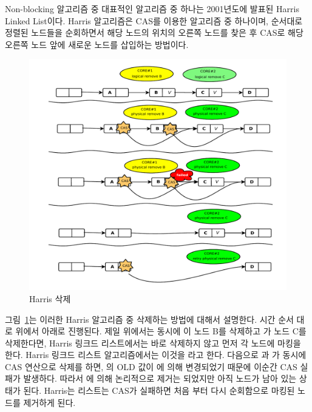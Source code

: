 Non-blocking 알고리즘 중 대표적인 알고리즘 중 하나는 2001년도에 발표된 
Harris Linked List이다. 
Harris 알고리즘은 CAS를 이용한 알고리즘 중 하나이며, 순서대로 정렬된 노드들을 
순회하면서 해당 노드의 위치의 오른쪽 노드를 찾은 후 CAS로 해당 오른쪽 노드 앞에 새로운 노드를 삽입하는 방법이다.


\begin{figure}[h!]
    \centering
    \includegraphics[width=1\textwidth]{fig/harris/harris}
    \caption{Harris 삭제}
  \label{fig:harris}
\end{figure}


그림~\ref{fig:harris}는 이러한 Harris 알고리즘 중 삭제하는 방법에 대해서 설명한다.
시간 순서 대로 위에서 아래로 진행된다.
제일 위에서는 동시에 이 노드 B를 삭제하고 가 노드 C를 삭제한다면,
Harris 링크드 리스트에서는 바로 삭제하지 않고 먼저 각 노드에 마킹을 한다. 
Harris 링크드 리스트 알고리즘에서는 이것을 라고 한다.
다음으로 과 가 동시에 CAS 연산으로 삭제를 하면, 의 OLD 값이 
에 의해 변경되었기 때문에 이순간 CAS 실패가 발생하다. 
따라서 에 의해 논리적으로 제거는 되었지만 아직 노드가 남아 있는 상태가 된다.
Harris는 리스트는 CAS가 실패하면 처음 부터 다시 순회함으로 마킹된 노드를 제거하게 된다. 



